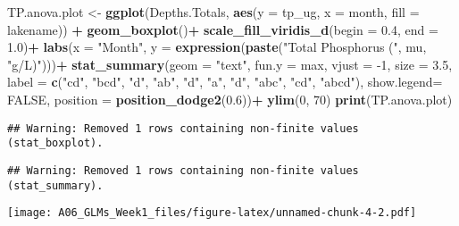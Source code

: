 \documentclass[]{article}
\newenvironment{Shaded}{\begin{snugshade}}{\end{snugshade}}
\newcommand{\DataTypeTok}[1]{\textcolor[rgb]{0.13,0.29,0.53}{#1}}
\newcommand{\DecValTok}[1]{\textcolor[rgb]{0.00,0.00,0.81}{#1}}
\newcommand{\FloatTok}[1]{\textcolor[rgb]{0.00,0.00,0.81}{#1}}
\newcommand{\KeywordTok}[1]{\textcolor[rgb]{0.13,0.29,0.53}{\textbf{#1}}}
\newcommand{\NormalTok}[1]{#1}
\newcommand{\OperatorTok}[1]{\textcolor[rgb]{0.81,0.36,0.00}{\textbf{#1}}}
\newcommand{\OtherTok}[1]{\textcolor[rgb]{0.56,0.35,0.01}{#1}}
\newcommand{\StringTok}[1]{\textcolor[rgb]{0.31,0.60,0.02}{#1}}
\begin{document}
\begin{Shaded}
\begin{Highlighting}[]
\NormalTok{TP.anova.plot <-}\StringTok{ }\KeywordTok{ggplot}\NormalTok{(Depths.Totals, }\KeywordTok{aes}\NormalTok{(}\DataTypeTok{y =}\NormalTok{ tp_ug, }\DataTypeTok{x =}\NormalTok{ month, }\DataTypeTok{fill =}\NormalTok{ lakename)) }\OperatorTok{+}
\StringTok{  }\KeywordTok{geom_boxplot}\NormalTok{()}\OperatorTok{+}
\StringTok{  }\KeywordTok{scale_fill_viridis_d}\NormalTok{(}\DataTypeTok{begin =} \FloatTok{0.4}\NormalTok{, }\DataTypeTok{end =} \FloatTok{1.0}\NormalTok{)}\OperatorTok{+}
\StringTok{  }\KeywordTok{labs}\NormalTok{(}\DataTypeTok{x =} \StringTok{"Month"}\NormalTok{, }\DataTypeTok{y =} \KeywordTok{expression}\NormalTok{(}\KeywordTok{paste}\NormalTok{(}\StringTok{"Total Phosphorus ("}\NormalTok{, mu, }\StringTok{"g/L)"}\NormalTok{)))}\OperatorTok{+}
\StringTok{  }\KeywordTok{stat_summary}\NormalTok{(}\DataTypeTok{geom =} \StringTok{"text"}\NormalTok{, }\DataTypeTok{fun.y =}\NormalTok{ max, }\DataTypeTok{vjust =} \DecValTok{-1}\NormalTok{, }\DataTypeTok{size =} \FloatTok{3.5}\NormalTok{, }
               \DataTypeTok{label =} \KeywordTok{c}\NormalTok{(}\StringTok{"cd"}\NormalTok{, }\StringTok{"bcd"}\NormalTok{, }\StringTok{"d"}\NormalTok{, }\StringTok{"ab"}\NormalTok{, }\StringTok{"d"}\NormalTok{, }\StringTok{"a"}\NormalTok{, }\StringTok{"d"}\NormalTok{, }\StringTok{"abc"}\NormalTok{, }\StringTok{"cd"}\NormalTok{, }\StringTok{"abcd"}\NormalTok{), }
               \DataTypeTok{show.legend=} \OtherTok{FALSE}\NormalTok{,}
               \DataTypeTok{position =} \KeywordTok{position_dodge2}\NormalTok{(}\FloatTok{0.6}\NormalTok{))}\OperatorTok{+}
\StringTok{  }\KeywordTok{ylim}\NormalTok{(}\DecValTok{0}\NormalTok{, }\DecValTok{70}\NormalTok{)}
\KeywordTok{print}\NormalTok{(TP.anova.plot)}
\end{Highlighting}
\end{Shaded}

\begin{verbatim}
## Warning: Removed 1 rows containing non-finite values (stat_boxplot).
\end{verbatim}

\begin{verbatim}
## Warning: Removed 1 rows containing non-finite values (stat_summary).
\end{verbatim}

\texttt{[image: A06\_GLMs\_Week1\_files/figure-latex/unnamed-chunk-4-2.pdf]}
\end{document}
